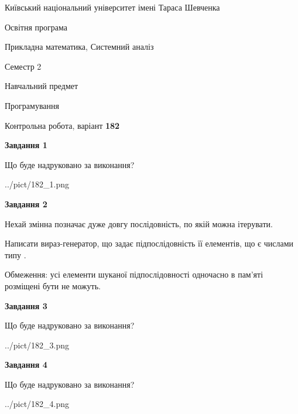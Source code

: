 \documentclass[12pt, ukrainian]{article}
\begin{document}
{{\begin {small}\par
{ \center  Київський національний університет імені Тараса Шевченка \par}
{\parbox {5 cm}{Освітня програма \hfill}{\parbox {8 cm}{Прикладна математика, Системний аналіз \hfill}}\parbox {5 cm}{\hfill Семестр 2}}\par
{\parbox {5 cm} {Навчальний предмет \hfill}\parbox {7 cm}{Програмування \hfill}\parbox {6cm}{\hfill}\par}\vspace{-7pt} \end{small}}{\center Контрольна робота, варіант  \No \textbf
{ 182 }\par}}
{
\begin {large}
{\begin {center}\textbf{Завдання 1}\end {center}}\par
Що буде надруковано за виконання?\par\par
\begin{center}
	{../pict/182_1.png}
\end{center}
\newpage

{\begin {center}\textbf{Завдання 2}\end {center}}\par
Нехай змінна  позначає дуже довгу послідовність, по якій можна ітерувати.

Написати вираз-генератор, що задає підпослідовність її елементів, що є числами типу .

Обмеження: усі елементи шуканої підпослідовності одночасно в пам'яті розміщені бути не можуть.\par
\newpage

{\begin {center}\textbf{Завдання 3}\end {center}}\par
Що буде надруковано за виконання?
\begin{center}
	{../pict/182_3.png}
\end{center}
\newpage

{\begin {center}\textbf{Завдання 4}\end {center}}\par
Що буде надруковано за виконання?\par
\begin{center}
	{../pict/182_4.png}
\end{center}
\newpage


\end{large}}
\end{document}
